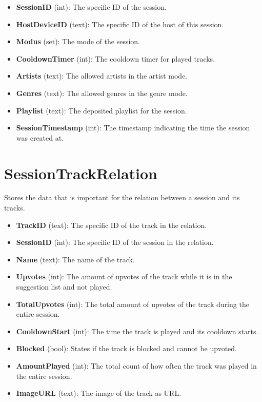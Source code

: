 \documentclass[oneside, ngerman]{sdqtechreport}
\begin{document}
\begin{itemize}
    \item \textbf{SessionID} (int): The specific ID of the session.
    \item \textbf{HostDeviceID} (text): The specific ID of the host of this session.
    \item \textbf{Modus} (set): The mode of the session.
    \item \textbf{CooldownTimer} (int): The cooldown timer for played tracks.
    \item \textbf{Artists} (text): The allowed artists in the artist mode.
    \item \textbf{Genres} (text): The allowed genres in the genre mode.
    \item \textbf{Playlist} (text): The deposited playlist for the session.
    \item \textbf{SessionTimestamp} (int): The timestamp indicating the time the session was created at.
\end{itemize}

\section{SessionTrackRelation}

Stores the data that is important for the relation between a session and its tracks.

\begin{itemize}
    \item \textbf{TrackID} (text): The specific ID of the track in the relation.
    \item \textbf{SessionID} (int): The specific ID of the session in the relation.
    \item \textbf{Name} (text): The name of the track.
    \item \textbf{Upvotes} (int): The amount of upvotes of the track while it is in the suggestion list and not played.
    \item \textbf{TotalUpvotes} (int): The total amount of upvotes of the track during the entire session.
    \item \textbf{CooldownStart} (int): The time the track is played and its cooldown starts.
    \item \textbf{Blocked} (bool): States if the track is blocked and cannot be upvoted.
    \item \textbf{AmountPlayed} (int): The total count of how often the track was played in the entire session.
    \item \textbf{ImageURL} (text): The image of the track as URL.
\end{itemize}
\end{document}
